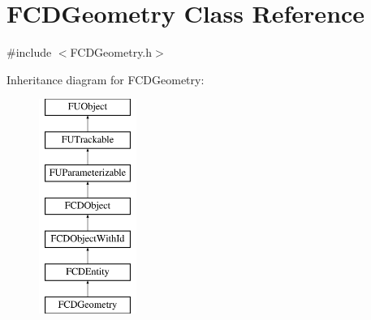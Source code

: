 \hypertarget{classFCDGeometry}{
\section{FCDGeometry Class Reference}
\label{classFCDGeometry}
}


{\ttfamily \#include $<$FCDGeometry.h$>$}

Inheritance diagram for FCDGeometry:\begin{figure}[H]
\begin{center}
\leavevmode
\includegraphics[height=7.000000cm]{classFCDGeometry}
\end{center}
\end{figure}
